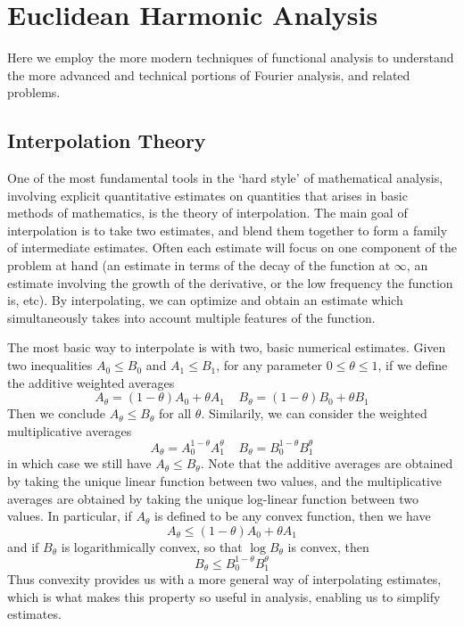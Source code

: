 \part{Euclidean Harmonic Analysis}

Here we employ the more modern techniques of functional analysis to understand the more advanced and technical portions of Fourier analysis, and related problems.

\chapter{Interpolation Theory}

One of the most fundamental tools in the `hard style' of mathematical analysis, involving explicit quantitative estimates on quantities that arises in basic methods of mathematics, is the theory of interpolation. The main goal of interpolation is to take two estimates, and blend them together to form a family of intermediate estimates. Often each estimate will focus on one component of the problem at hand (an estimate in terms of the decay of the function at $\infty$, an estimate involving the growth of the derivative, or the low frequency the function is, etc). By interpolating, we can optimize and obtain an estimate which simultaneously takes into account multiple features of the function.

The most basic way to interpolate is with two, basic numerical estimates. Given two inequalities $A_0 \leq B_0$ and $A_1 \leq B_1$, for any parameter $0 \leq \theta \leq 1$, if we define the additive weighted averages
%
\[ A_\theta = (1 - \theta) A_0 + \theta A_1\ \ \ \ \ B_\theta = (1 - \theta) B_0 + \theta B_1 \]
%
Then we conclude $A_\theta \leq B_\theta$ for all $\theta$. Similarily, we can consider the weighted multiplicative averages
%
\[ A_\theta = A_0^{1 - \theta} A_1^\theta\ \ \ \ \ B_\theta = B_0^{1 - \theta}B_1^\theta \]
%
in which case we still have $A_\theta \leq B_\theta$. Note that the additive averages are obtained by taking the unique linear function between two values, and the multiplicative averages are obtained by taking the unique log-linear function between two values. In particular, if $A_\theta$ is defined to be any convex function, then we have
%
\[ A_\theta \leq (1 - \theta) A_0 + \theta A_1  \]
%
and if $B_\theta$ is logarithmically convex, so that $\log B_\theta$ is convex, then
%
\[ B_\theta \leq B_0^{1 - \theta} B_1^\theta \]
%
Thus convexity provides us with a more general way of interpolating estimates, which is what makes this property so useful in analysis, enabling us to simplify estimates.

